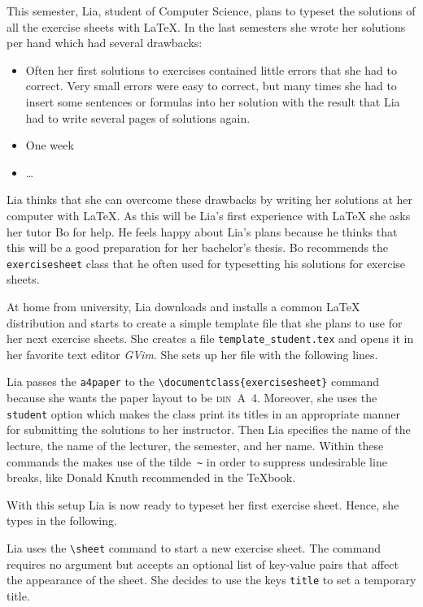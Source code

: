 \documentclass{report}
\def\exercisesheet{\texttt{exercisesheet}}
\begin{document}
This semester, Lia, student of Computer Science, plans to typeset the
solutions of all the exercise sheets with \LaTeX{}. In the last
semesters she wrote her solutions per hand which had several
drawbacks:
\begin{itemize}
  \item Often her first solutions to exercises contained little errors
    that she had to correct. Very small errors were easy to correct,
    but many times she had to insert some sentences or formulas into
    her solution with the result that Lia had to write several pages
    of solutions again.
  \item One week 
  \item \ldots
\end{itemize}
Lia thinks that she can overcome these drawbacks by writing her
solutions at her computer with \LaTeX. As this will be Lia's first
experience with \LaTeX{} she asks her tutor Bo for help. He feels
happy about Lia's plans because he thinks that this will be a good
preparation for her bachelor's thesis. Bo recommends the
\exercisesheet{} class that he often used for typesetting his
solutions for exercise sheets.

At home from university, Lia downloads and installs a common \LaTeX{}
distribution and starts to create a simple template file that she
plans to use for her next exercise sheets. She creates a file 
\lstinline[language=bash]{template_student.tex} and opens it in her
favorite text editor \emph{GVim}. She sets up her file with the
following lines.

Lia passes the \lstinline{a4paper} to the
\lstinline|\documentclass{exercisesheet}| command because she wants
the paper layout to be \textsc{din}~A~4. Moreover, she uses the
\lstinline{student} option which makes the class print its titles in
an appropriate manner for submitting the solutions to her instructor.
Then Lia specifies the name of the lecture, the name of the lecturer,
the semester, and her name. Within these commands the makes use of the
tilde~\lstinline{~} in order to suppress undesirable line breaks, like
Donald Knuth recommended in the \TeX{}book.

With this setup Lia is now ready to typeset her first exercise sheet.
Hence, she types in the following.

Lia uses the \lstinline|\sheet| command to start a new exercise sheet.
The command requires no argument but accepts an optional list of
key-value pairs that affect the appearance of the sheet. She decides
to use the keys \lstinline{title} to set a temporary title.
\end{document}
